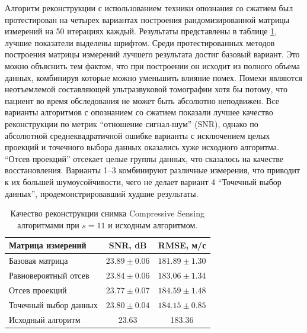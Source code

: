 \documentclass[14pt]{matmex-diploma}
\begin{document}
Алгоритм реконструкции с использованием техники опознания со сжатием был протестирован на четырех вариантах построения рандомизированной матрицы измерений на 50 итерациях каждый. Результаты представлены в таблице \ref{table:fin_results}, лучшие показатели выделены шрифтом. Среди протестированных методов построения матрицы измерений лучшего результата достиг базовый вариант. Это можно объяснить тем фактом, что при построении он исходит из полного объема данных, комбинируя которые можно уменьшить влияние помех. Помехи являются неотъемлемой составляющей ультразвуковой томографии хотя бы потому, что пациент во время обследования не может быть абсолютно неподвижен. Все варианты алгоритмов с опознанием со сжатием показали лучшее качество реконструкции по метрик ``отношение сигнал-шум'' (SNR), однако по абсолютной среднеквадратичной ошибке варианты с исключением целых проекций и точечного выбора данных оказались хуже исходного алгоритма. ``Отсев проекций'' отсекает целые группы данных, что сказалось на качестве восстановления. Варианты 1--3 комбинируют различные измерения, что приводит к их большей шумоусойчивости, чего не делает вариант 4 ``Точечный выбор данных'', продемонстрировавший худшие результаты.

\begin{table}
\centering
\begin{tabular}{| l | c | c | }
    \hline
    Матрица измерений & SNR, dB & RMSE, м/с \\
    \hline
    Базовая матрица & $\mathbf{23.89 \pm 0.06}$ & $\mathbf{181.89 \pm 1.30}$ \\
    Равновероятный отсев & $23.84 \pm 0.06$ & $183.06 \pm 1.34$ \\
    Отсев проекций & $23.77 \pm 0.07$ & $184.59 \pm 1.48$ \\
    Точечный выбор данных & $23.80 \pm 0.04$ & $184.15 \pm 0.85$ \\
    \hline
    Исходный алгоритм & 23.63 & 183.36 \\
    \hline
\end{tabular}
\caption{\small Качество реконструкции снимка Compressive Sensing алгоритмами при $s = 11$  и исходным алгоритмом.}
\label{table:fin_results}
\end{table}
\end{document}
